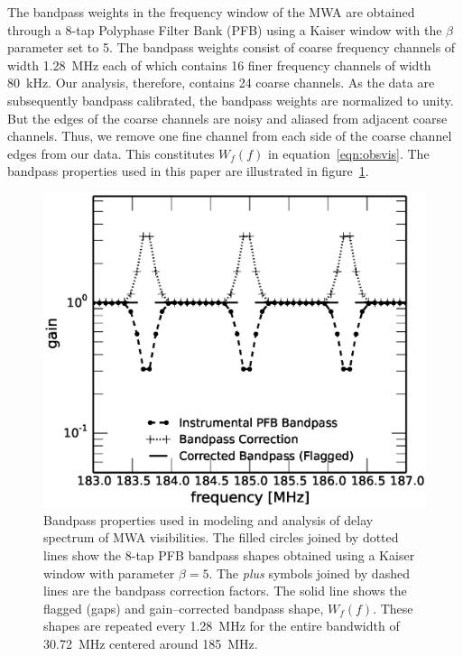 \documentclass[preprint2,iop,numberedappendix]{emulateapj}
\begin{document}
The bandpass weights in the frequency window of the MWA are obtained through a 8-tap Polyphase Filter Bank (PFB) using a Kaiser window with the $\beta$ parameter set to 5. The bandpass weights consist of coarse frequency channels of width 1.28~MHz each of which contains 16 finer frequency channels of width 80~kHz. Our analysis, therefore, contains 24 coarse channels. As the data are subsequently bandpass calibrated, the bandpass weights are normalized to unity. But the edges of the coarse channels are noisy and aliased from adjacent coarse channels. Thus, we remove one fine channel from each side of the coarse channel edges from our data. This constitutes $W_f(f)$ in equation~\ref{eqn:obsvis}. The bandpass properties used in this paper are illustrated in figure~\ref{fig:bandpass}. 

\begin{figure}[htb]
\centering
\includegraphics[width=\linewidth]{figures/v1_0/bandpass_properties}
\caption{Bandpass properties used in modeling and analysis of delay spectrum of MWA visibilities. The filled circles joined by dotted lines show the 8-tap PFB bandpass shapes obtained using a Kaiser window with parameter $\beta=5$. The {\it plus} symbols joined by dashed lines are the bandpass correction factors. The solid line shows the flagged (gaps) and gain--corrected bandpass shape, $W_f(f)$. These shapes are repeated every 1.28~MHz for the entire bandwidth of 30.72~MHz centered around 185~MHz. \label{fig:bandpass}}
\end{figure}
\end{document}
